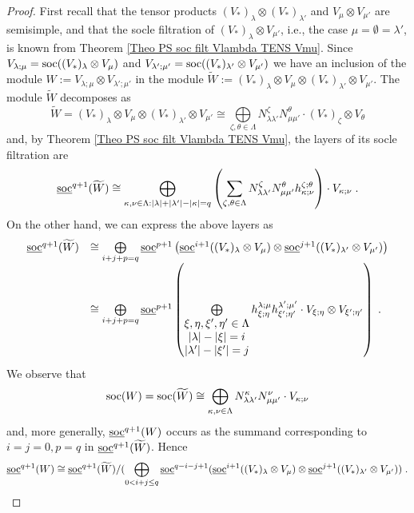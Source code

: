 \documentclass[12pt]{article}
\def\ul  {\underline}
\def\wt  {\widetilde}
\begin{document}
\begin{proof}
First recall that the tensor products $(V_*)_\lambda\otimes (V_*)_{\lambda'}$ and $V_\mu\otimes V_{\mu'}$ are semisimple, and that the socle filtration of $(V_*)_\lambda\otimes V_{\mu'}$, i.e., the case $\mu=\emptyset=\lambda'$, is known from Theorem \ref{Theo PS soc filt Vlambda TENS Vmu}. Since $V_{\lambda;\mu} = {\rm soc}((V_*)_\lambda\otimes V_\mu)$ and $V_{\lambda';\mu'} = {\rm soc}((V_*)_{\lambda'}\otimes V_{\mu'})$ we have an inclusion of the module $W:=V_{\lambda;\mu}\otimes V_{\lambda';\mu'}$ in the module $\wt W:=(V_*)_\lambda\otimes V_\mu \otimes (V_*)_{\lambda'}\otimes V_{\mu'}$. The module $\wt W$ decomposes as
$$
\wt W=(V_*)_\lambda\otimes V_\mu \otimes (V_*)_{\lambda'}\otimes V_{\mu'} \cong \bigoplus\limits_{\zeta,\theta\in\Lambda} N^{\zeta}_{\lambda\lambda'}N^{\theta}_{\mu\mu'} \cdot (V_*)_{\zeta}\otimes V_\theta
$$
and, by Theorem \ref{Theo PS soc filt Vlambda TENS Vmu}, the layers of its socle filtration are
$$
\ul{\rm soc}^{q+1}(\wt W) \cong \bigoplus\limits_{\kappa,\nu\in\Lambda: |\lambda|+|\lambda'|-|\kappa|=q} \left( \sum\limits_{\zeta,\theta\in\Lambda} N^{\zeta}_{\lambda\lambda'}N^{\theta}_{\mu\mu'} h^{\zeta;\theta}_{\kappa;\nu} \right) \cdot V_{\kappa;\nu} \;.
$$
On the other hand, we can express the above layers as
\begin{gather*}
\begin{array}{rl}
\ul{\rm soc}^{q+1}(\wt W) & \cong \bigoplus\limits_{i+j+p=q} \ul{\rm soc}^{p+1}\left( \ul{\rm soc}^{i+1}((V_*)_\lambda\otimes V_\mu) \otimes \ul{\rm soc}^{j+1}((V_*)_{\lambda'}\otimes V_{\mu'}) \right) \\
 & \cong \bigoplus\limits_{i+j+p=q} \ul{\rm soc}^{p+1}\left( \bigoplus\limits_{\begin{matrix}\xi,\eta,\xi',\eta'\in\Lambda\\ |\lambda|-|\xi|=i\\ |\lambda'|-|\xi'|=j\end{matrix}}  h^{\lambda;\mu}_{\xi;\eta} h^{\lambda';\mu'}_{\xi';\eta'}  \cdot V_{\xi;\eta} \otimes V_{\xi';\eta'} \right) \;.
\end{array}
\end{gather*}
We observe that
$$
{\rm soc}(W)={\rm soc}(\wt W) \cong \bigoplus\limits_{\kappa,\nu\in\Lambda} N^{\kappa}_{\lambda\lambda'}N^{\nu}_{\mu\mu'} \cdot V_{\kappa;\nu}
$$
and, more generally, $\ul{\rm soc}^{q+1}(W)$ occurs as the summand corresponding to $i=j=0,p=q$ in $\ul{\rm soc}^{q+1}(\wt W)$. Hence
$$
\ul{\rm soc}^{q+1}(W) \cong \ul{\rm soc}^{q+1}(\wt W)/(\bigoplus\limits_{0<i+j\leq q} \ul{\rm soc}^{q-i-j+1}( \ul{\rm soc}^{i+1}((V_*)_\lambda\otimes V_\mu) \otimes \ul{\rm soc}^{j+1}((V_*)_{\lambda'}\otimes V_{\mu'})) \;.
$$
\end{proof}
\end{document}
